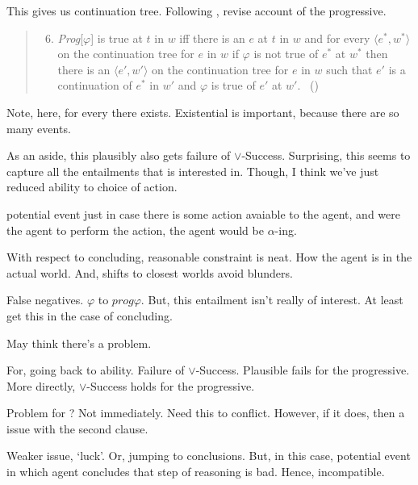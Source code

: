 \begin{note}
  This gives us continuation tree.
  Following \citeauthor{Szabo:2004ul}, revise account of the progressive.

  \begin{quote}
    \begin{enumerate}[label=(\Roman*), ref=(\Roman*)]
      \setcounter{enumi}{5}
    \item
      \emph{Prog}[\(\varphi\)] is true at \(t\) in \(w\) iff there is an \(e\) at \(t\) in \(w\) and for every \(\langle e^{\ast}, w^{\ast} \rangle\) on the continuation tree for \(e\) in \(w\) if \(\varphi\) is not true of \(e^{\ast}\) at \(w^{\ast}\) then there is an \(\langle e', w' \rangle\) on the continuation tree for \(e\) in \(w\) such that \(e'\) is a continuation of \(e^{\ast}\) in \(w'\) and \(\varphi\) is true of \(e'\) at \(w'\).%
      \mbox{ }\hfill\mbox{(\citeyear[37]{Szabo:2004ul})}
    \end{enumerate}
  \end{quote}

  Note, here, for every there exists.
  Existential is important, because there are so many events.

  As an aside, this plausibly also gets failure of \(\lor\)-Success.
  Surprising, this seems to capture all the entailments that \citeauthor{Boylan:2020aa} is interested in.
  Though, I think we've just reduced ability to choice of action.
\end{note}

\begin{note}
  potential event just in case there is some action avaiable to the agent, and were the agent to perform the action, the agent would be \(\alpha\)-ing.
\end{note}

\begin{note}
  With respect to concluding, reasonable constraint is neat.
  How the agent is in the actual world.
  And, shifts to closest worlds avoid blunders.
\end{note}



\begin{note}
  False negatives.
  \(\varphi\) to \(prog \varphi\).
  But, this entailment isn't really of interest.
  At least get this in the case of concluding.
\end{note}

\begin{note}
  May think there's a problem.

  For, going back to ability.
  Failure of \(\lor\)-Success.
  Plausible fails for the progressive.
  More directly, \(\lor\)-Success holds for the progressive.

  Problem for ?
  Not immediately.
  Need this to conflict.
  However, if it does, then a issue with the second clause.

  Weaker issue, `luck'.
  Or, jumping to conclusions.
  But, in this case, potential event in which agent concludes that step of reasoning is bad.
  Hence, incompatible.
\end{note}

